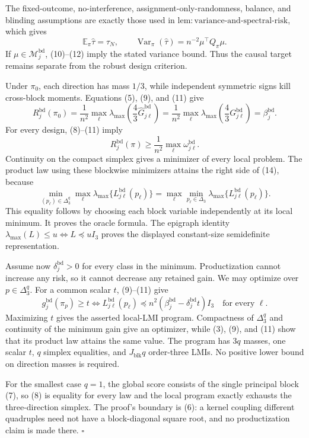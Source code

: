 The fixed-outcome, no-interference, assignment-only-randomness, balance, and blinding assumptions are exactly those used in \(\mathrm{lem:variance\text{-}and\text{-}spectral\text{-}risk}\), which gives
\[
\mathbb E_\pi\widehat\tau=\tau_N,
\qquad
\operatorname{Var}_\pi(\widehat\tau)=n^{-2}\mu^\top Q_\pi\mu.
\tag{12}
\]
If \(\mu\in\mathcal M_j^{\mathrm{bd}}\), (10)--(12) imply the stated variance bound.  Thus the causal target remains separate from the robust design criterion.

Under \(\pi_0\), each direction has mass \(1/3\), while independent symmetric signs kill cross-block moments.  Equations (5), (9), and (11) give
\[
R_j^{\mathrm{bd}}(\pi_0)
=\frac1{n^2}\max_\ell
\lambda_{\max}\!\left(\frac43\widehat G^{\mathrm{bd}}_{j\ell}\right)
=\frac1{n^2}\max_\ell
\lambda_{\max}\!\left(\frac43G^{\mathrm{bd}}_{j\ell}\right)
=\beta_j^{\mathrm{bd}}.
\tag{13}
\]
For every design, (8)--(11) imply
\[
R_j^{\mathrm{bd}}(\pi)
\ge\frac1{n^2}\max_\ell\omega^{\mathrm{bd}}_{j\ell}.
\tag{14}
\]
Continuity on the compact simplex gives a minimizer of every local problem.  The product law using these blockwise minimizers attains the right side of (14), because
\[
\min_{(p_\ell)\in\Delta_3^q}
\max_\ell\lambda_{\max}\{L^{\mathrm{bd}}_{j\ell}(p_\ell)\}
=\max_\ell\min_{p_\ell\in\Delta_3}
\lambda_{\max}\{L^{\mathrm{bd}}_{j\ell}(p_\ell)\}.
\tag{15}
\]
This equality follows by choosing each block variable independently at its local minimum.  It proves the oracle formula.  The epigraph identity
\(\lambda_{\max}(L)\le u\iff L\preceq uI_3\) proves the displayed constant-size semidefinite representation.

Assume now \(\delta_j^{\mathrm{bd}}>0\) for every class in the minimum.  Productization cannot increase any risk, so it cannot decrease any retained gain.  We may optimize over \(p\in\Delta_3^q\).  For a common scalar \(t\), (9)--(11) give
\[
g_j^{\mathrm{bd}}(\pi_p)\ge t
\iff
L^{\mathrm{bd}}_{j\ell}(p_\ell)
\preceq n^2(\beta_j^{\mathrm{bd}}-\delta_j^{\mathrm{bd}}t)I_3
\quad\text{for every }\ell.
\tag{16}
\]
Maximizing \(t\) gives the asserted local-LMI program.  Compactness of \(\Delta_3^q\) and continuity of the minimum gain give an optimizer, while (3), (9), and (11) show that its product law attains the same value.  The program has \(3q\) masses, one scalar \(t\), \(q\) simplex equalities, and \(J_{\mathrm{blk}}q\) order-three LMIs.  No positive lower bound on direction masses is required.

For the smallest case \(q=1\), the global score consists of the single principal block (7), so (8) is equality for every law and the local program exactly exhausts the three-direction simplex.  The proof's boundary is (6): a kernel coupling different quadruples need not have a block-diagonal square root, and no productization claim is made there.  \(\square\)